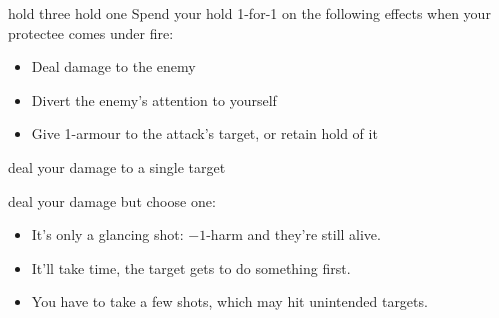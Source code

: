 {hold three}
{hold one}
Spend your hold 1-for-1 on the following effects when your protectee comes under fire:
\begin{itemize}
\item Deal damage to the enemy
\item Divert the enemy's attention to yourself
\item Give 1-armour to the attack's target, or retain hold of it
\end{itemize}

%
%  
%
%
%
%
%


{deal your damage to a single target}
{deal your damage but choose one:
\begin{itemize}
\item It's only a glancing shot: $-1$-harm and they're still alive.
\item It'll take time, the target gets to do something first.
\item You have to take a few shots, which may hit unintended targets.
\end{itemize}}

